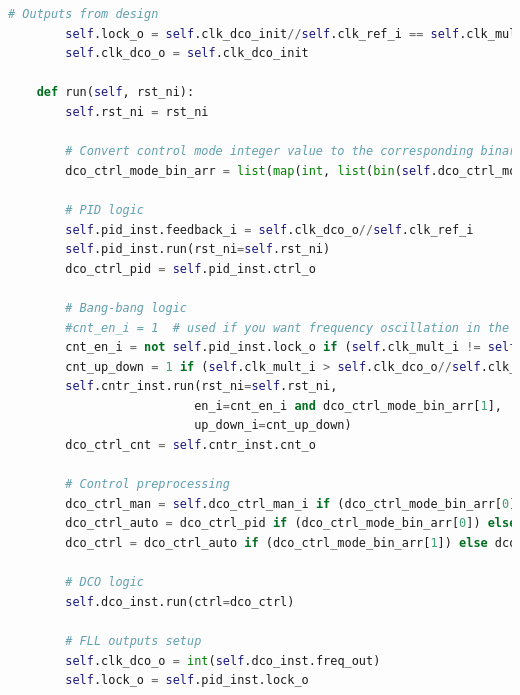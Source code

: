 \documentclass[master]{finthesis}
\def \FLL  {FLL} %
\begin{document}
\begin{lstlisting}[language=Python, caption={Имплементација модела \FLL\ компоненте.}, label={lst:py:fll}]
        # Outputs from design
        self.lock_o = self.clk_dco_init//self.clk_ref_i == self.clk_mult_i
        self.clk_dco_o = self.clk_dco_init

    def run(self, rst_ni):
        self.rst_ni = rst_ni

        # Convert control mode integer value to the corresponding binary array (1/0 integers) 
        dco_ctrl_mode_bin_arr = list(map(int, list(bin(self.dco_ctrl_mode_i)[2:][::-1])))

        # PID logic
        self.pid_inst.feedback_i = self.clk_dco_o//self.clk_ref_i
        self.pid_inst.run(rst_ni=self.rst_ni)
        dco_ctrl_pid = self.pid_inst.ctrl_o

        # Bang-bang logic
        #cnt_en_i = 1  # used if you want frequency oscillation in the stable state
        cnt_en_i = not self.pid_inst.lock_o if (self.clk_mult_i != self.clk_dco_o//self.clk_ref_i) else 0
        cnt_up_down = 1 if (self.clk_mult_i > self.clk_dco_o//self.clk_ref_i) else 0
        self.cntr_inst.run(rst_ni=self.rst_ni,
                          en_i=cnt_en_i and dco_ctrl_mode_bin_arr[1],
                          up_down_i=cnt_up_down)
        dco_ctrl_cnt = self.cntr_inst.cnt_o

        # Control preprocessing
        dco_ctrl_man = self.dco_ctrl_man_i if (dco_ctrl_mode_bin_arr[0]) else 203
        dco_ctrl_auto = dco_ctrl_pid if (dco_ctrl_mode_bin_arr[0]) else dco_ctrl_cnt
        dco_ctrl = dco_ctrl_auto if (dco_ctrl_mode_bin_arr[1]) else dco_ctrl_man

        # DCO logic
        self.dco_inst.run(ctrl=dco_ctrl)

        # FLL outputs setup
        self.clk_dco_o = int(self.dco_inst.freq_out)
        self.lock_o = self.pid_inst.lock_o
\end{lstlisting}
\end{document}
